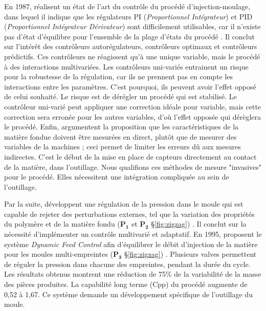 En 1987, \citeauthor{agrawal_injection-molding_1987} réalisent un état de l'art du contrôle du procédé d’injection-moulage, dans lequel il indique que les régulateurs PI (\textit{Proportionnel Intégrateur}) et PID (\textit{Proportionnel Intégrateur Dérivateur}) sont difficilement utilisables, car il n’existe pas d’état d’équilibre pour l’ensemble de la plage d'états du procédé \cite{agrawal_injection-molding_1987}.
Il conclut sur l’intérêt des contrôleurs autorégulateurs, contrôleurs optimaux et contrôleurs prédictifs.
Ces contrôleurs ne réagissent qu’à une unique variable, mais le procédé à des interactions multivariées.
Les contrôleurs uni-variés entrainent un risque pour la robustesse de la régulation, car ils ne prennent pas en compte les interactions entre les paramètres.
C'est pourquoi, ils peuvent avoir l'effet opposé de celui souhaité.
Le risque est de dérégler un procédé qui est stabilisé.
Le contrôleur uni-varié peut appliquer une correction idéale pour variable, mais cette correction sera erronée pour les autres variables, d'où l'effet opposée qui dérèglera le procédé.
Enfin, \citeauthor{agrawal_injection-molding_1987} argumentent la proposition que les caractéristiques de la matière fondue doivent être mesurées en direct, plutôt que de mesurer des variables de la machines ; ceci permet de limiter les erreurs dû aux mesures indirectes.
C'est le début de la mise en place de capteurs directement au contact de la matière, dans l'outillage.
Nous qualifions ces méthodes de mesure "invasives" pour le procédé.
Elles nécessitent une intégration compliquée au sein de l'outillage.

Par la suite, \citeauthor{fara_comprehensive_1990} développent une régulation de la pression dans le moule qui est capable de rejeter des perturbations externes, tel que la variation des propriétés du polymère et de la matière fondu ($\boldsymbol{P_1}$ et $\boldsymbol{P_2}$ §\ref{fig:zigzag}) \cite{fara_comprehensive_1990}.
Il conclut sur la nécessité d'implémenter un contrôle multivarié et adaptatif.
En 1995, \citeauthor{kazmer_dynamic_1995} proposent le système \textit{Dynamic Feed Control} afin d'équilibrer le débit d'injection de la matière pour les moules multi-empreintes ($\boldsymbol{P_3}$ §\ref{fig:zigzag}) \cite{kazmer_dynamic_1995}.
Plusieurs valves permettent de réguler la pression dans chacune des empreintes, pendant la durée du cycle.
Les résultats obtenus montrent une réduction de 75\% de la variabilité de la masse des pièces produites.
La capabilité long terme (Cpp) du procédé augmente de 0,52 à 1,67.
Ce système demande un développement spécifique de l'outillage du moule.


